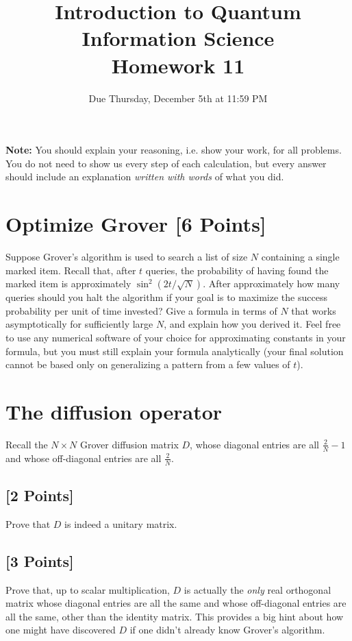 \documentclass[11pt]{article}
\providecommand{\due}{Due Thursday, December 5th at 11:59 PM}
\begin{document}
\title{Introduction to Quantum Information Science\\Homework 11}
\date{\due}

\maketitle

\textbf{Note:} You should explain your reasoning, i.e. show your work, for all problems. You do not need to show us every step of each calculation, but every answer should include an explanation \emph{written with words} of what you did.

\section{Optimize Grover [6 Points]} Suppose Grover's algorithm is used to search a list of size $N$ containing a single marked item.  Recall that, after $t$ queries, the probability of having found the marked item is approximately $\sin^2\left(2t/\sqrt{N} \right)$.  After approximately how many queries should you halt the algorithm if your goal is to maximize the success probability per unit of time invested? Give a formula in terms of $N$ that works asymptotically for sufficiently large $N$, and explain how you derived it. Feel free to use any numerical software of your choice for approximating constants in your formula, but you must still explain your formula analytically (your final solution cannot be based only on generalizing a pattern from a few values of $t$).


\section{The diffusion operator} Recall the $N\times N$ Grover diffusion matrix $D$, whose diagonal entries
are all $\frac{2}{N}-1$ and whose off-diagonal entries are all $\frac{2}{N}$.

\subsection{[2 Points]} Prove that $D$ is indeed a unitary matrix.



\subsection{[3 Points]} Prove that, up to scalar multiplication, $D$ is actually the \textit{only}
real orthogonal matrix whose diagonal entries are all the same and whose
off-diagonal entries are all the same, other than the identity matrix.
This provides a big hint about how one might have discovered $D$ if one
didn't already know Grover's algorithm.
\end{document}
